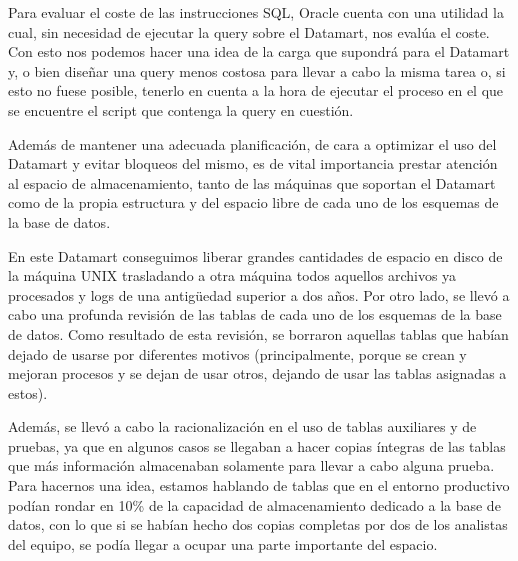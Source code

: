 \documentclass[a4paper, 12pt]{book}
\begin{document}
Para evaluar el coste de las instrucciones SQL, Oracle cuenta con una utilidad la cual, sin necesidad de ejecutar la query sobre el Datamart, nos evalúa el coste. Con esto nos podemos hacer una idea de la carga que supondrá para el Datamart y, o bien diseñar una query menos costosa para llevar a cabo la misma tarea o, si esto no fuese posible, tenerlo en cuenta a la hora de ejecutar el proceso en el que se encuentre el script que contenga la query en cuestión.

Además de mantener una adecuada planificación, de cara a optimizar el uso del Datamart y evitar bloqueos del mismo, es de vital importancia prestar atención al espacio de almacenamiento, tanto de las máquinas que soportan el Datamart como de la propia estructura y del espacio libre de cada uno de los esquemas de la base de datos.

En este Datamart conseguimos liberar grandes cantidades de espacio en disco de la máquina UNIX trasladando a otra máquina todos aquellos archivos ya procesados y logs de una antigüedad superior a dos años. Por otro lado, se llevó a cabo una profunda revisión de las tablas de cada uno de los esquemas de la base de datos. Como resultado de esta revisión, se borraron aquellas tablas que habían dejado de usarse por diferentes motivos (principalmente, porque se crean y mejoran procesos y se dejan de usar otros, dejando de usar las tablas asignadas a estos).

Además, se llevó a cabo la racionalización en el uso de tablas auxiliares y de pruebas, ya que en algunos casos se llegaban a hacer copias íntegras de las tablas que más información almacenaban solamente para llevar a cabo alguna prueba. Para hacernos una idea, estamos hablando de tablas que en el entorno productivo podían rondar en 10\% de la capacidad de almacenamiento dedicado a la base de datos, con lo que si se habían hecho dos copias completas por dos de los analistas del equipo, se podía llegar a ocupar una parte importante del espacio.


\end{document}
